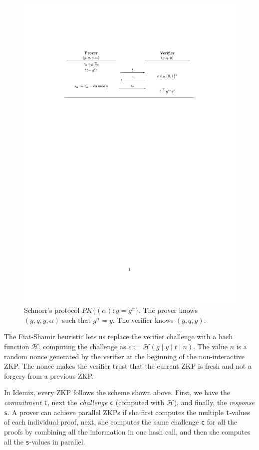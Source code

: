 \begin{figure}[bth]
	\includegraphics[width=\linewidth]{gfx/schnorr}
	\caption{Schnorr's protocol $PK\{ (\alpha) : y = g^\alpha \}$. The prover knows $(g,q,y,\alpha)$ such that $g^\alpha=y$. The verifier knows $(g,q,y)$.}
	\label{fig:schnorr}
\end{figure}

The Fiat-Shamir heuristic lets us replace the verifier challenge with a hash function $\mathcal{H}$, computing the challenge as $c:=\mathcal{H}(g\mid y\mid t\mid n)$. The value $n$ is a random nonce generated by the verifier at the beginning of the non-interactive ZKP. The nonce makes the verifier trust that the current ZKP is fresh and not a forgery from a previous ZKP.

In Idemix, every ZKP follows the scheme shown above. First, we have the \textit{commitment} \texttt{t}, next the \textit{challenge} \texttt{c} (computed with $\mathcal{H}$), and finally, the \textit{response} \texttt{s}. A prover can achieve parallel ZKPs if she first computes the multiple \texttt{t}-values of each individual proof, next, she computes the same challenge \texttt{c} for all the proofs by combining all the information in one hash call, and then she computes all the \texttt{s}-values in parallel.

